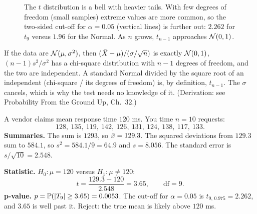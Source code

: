 \begin{figure}[H]
\centering
{}
\caption{The $t$ distribution is a bell with heavier tails. With few degrees of
freedom (small samples) extreme values are more common, so the two-sided cut-off for
$\alpha=0.05$ (vertical lines) is further out: $2.262$ for $t_9$ versus $1.96$ for
the Normal. As $n$ grows, $t_{n-1}$ approaches $\Normal(0,1)$.}
\label{fig:ht-tdist}
\end{figure}

\begin{whybox}
If the data are $\Normal(\mu,\sigma^2)$, then $(\Xbar-\mu)/(\sigma/\sqrt n)$ is
exactly $\Normal(0,1)$, $(n-1)s^2/\sigma^2$ has a chi-square distribution with $n-1$
degrees of freedom, and the two are independent. A standard Normal divided by the
square root of an independent (chi-square / its degrees of freedom) is, by
definition, $t_{n-1}$. The $\sigma$ cancels, which is why the test needs no knowledge
of it. (Derivation: see Probability From the Ground Up, Ch.~32.)
\end{whybox}

\begin{example}
A vendor claims mean response time $120$ ms. You time $n=10$ requests:
\[
  128,\ 135,\ 119,\ 142,\ 126,\ 131,\ 124,\ 138,\ 117,\ 133 .
\]
\textbf{Summaries.} The sum is $1293$, so $\xbar = 129.3$. The squared deviations from
$129.3$ sum to $584.1$, so $s^2 = 584.1/9 = 64.9$ and $s = 8.056$. The standard
error is $s/\sqrt{10} = 2.548$.

\textbf{Statistic.} $H_0\colon\mu=120$ versus $H_1\colon \mu\ne120$:
\[
  t = \frac{129.3 - 120}{2.548} = 3.65, \qquad \text{df} = 9 .
\]
\textbf{p-value.} $p = \P(|T_9| \ge 3.65) = 0.0053$. The cut-off for $\alpha=0.05$ is
$t_{9,\,0.975}=2.262$, and $3.65$ is well past it. Reject: the true mean is likely
above $120$ ms.
\end{example}

